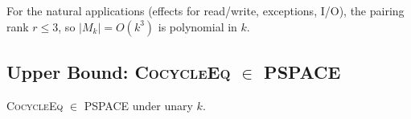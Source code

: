 \begin{remark}
For the natural applications (effects for read/write, exceptions,
I/O), the pairing rank $r\le 3$, so $|M_k|=O(k^3)$ is polynomial
in $k$.
\end{remark}

\subsection{Upper Bound: \textsc{CocycleEq} \texorpdfstring{$\in$}{in} PSPACE}
\label{sec:pspace-upper}

\begin{theorem}
\label{thm:pspace-in}
\textsc{CocycleEq} $\in$ \textsc{PSPACE} under unary $k$.
\end{theorem}

